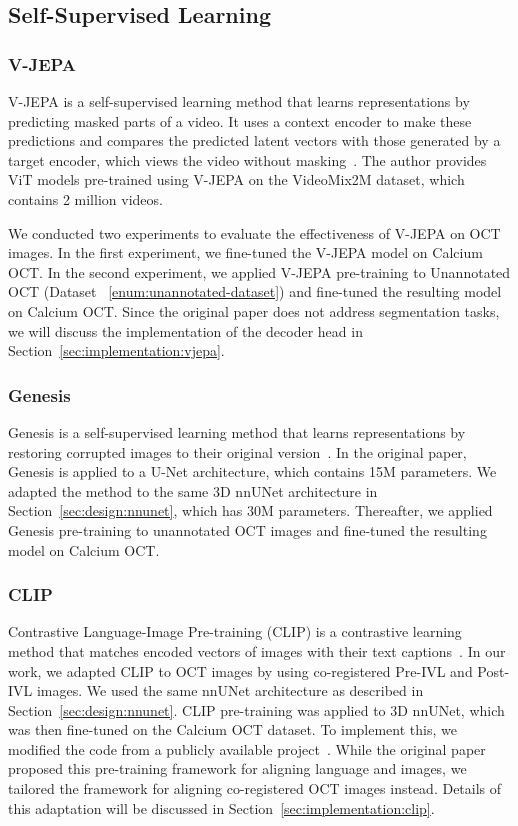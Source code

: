 \documentclass[a4paper,11pt,oneside]{report}
\begin{document}
\subsection{Self-Supervised Learning}
\subsubsection{V-JEPA}
V-JEPA is a self-supervised learning method that learns representations by predicting masked parts of a video. It uses a context encoder to make these predictions and compares the predicted latent vectors with those generated by a target encoder, which views the video without masking~\cite{Bardes2024Vjepa}. The author provides ViT models pre-trained using V-JEPA on the VideoMix2M dataset, which contains 2 million videos. 

We conducted two experiments to evaluate the effectiveness of V-JEPA on OCT images. In the first experiment, we fine-tuned the V-JEPA model on Calcium OCT. In the second experiment, we applied V-JEPA pre-training to Unannotated OCT (Dataset ~\ref{enum:unannotated-dataset}) and fine-tuned the resulting model on Calcium OCT. Since the original paper does not address segmentation tasks, we will discuss the implementation of the decoder head in Section~\ref{sec:implementation:vjepa}.

\subsubsection{Genesis}
Genesis is a self-supervised learning method that learns representations by restoring corrupted images to their original version~\cite{Zhou2021}. In the original paper, Genesis is applied to a U-Net architecture, which contains 15M parameters. We adapted the method to the same 3D nnUNet architecture in Section~\ref{sec:design:nnunet}, which has 30M parameters. Thereafter, we applied Genesis pre-training to unannotated OCT images and fine-tuned the resulting model on Calcium OCT.

\subsubsection{CLIP}
Contrastive Language-Image Pre-training (CLIP) is a contrastive learning method that matches encoded vectors of images with their text captions~\cite{Radford2021CLIP}. In our work, we adapted CLIP to OCT images by using co-registered Pre-IVL and Post-IVL images. We used the same nnUNet architecture as described in Section~\ref{sec:design:nnunet}. CLIP pre-training was applied to 3D nnUNet, which was then fine-tuned on the Calcium OCT dataset. To implement this, we modified the code from a publicly available project~\cite{Shariatnia2021}. While the original paper proposed this pre-training framework for aligning language and images, we tailored the framework for aligning co-registered OCT images instead. Details of this adaptation will be discussed in Section~\ref{sec:implementation:clip}. 
\end{document}
